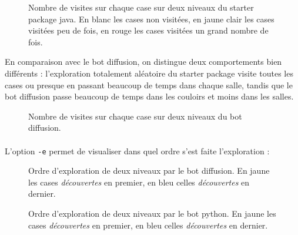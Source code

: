 \documentclass[a4paper,12pt]{article}
\begin{document}
\begin{figure}[H]
	\caption{Nombre de visites sur chaque case sur deux niveaux du starter
	package java. En blanc les cases non visitées, en jaune clair les cases
visitées peu de fois, en rouge les cases visitées un grand nombre de fois.}
	\resizebox{\columnwidth}{!}{}
\end{figure}

En comparaison avec le bot diffusion, on distingue deux comportements bien
différents : l'exploration totalement aléatoire du starter package visite
toutes les cases ou presque en passant beaucoup de temps dans chaque salle,
tandis que le bot diffusion passe beaucoup de temps dans les couloirs et moins
dans les salles.

\begin{figure}[H]
	\caption{Nombre de visites sur chaque case sur deux niveaux du bot diffusion.}
	\resizebox{\columnwidth}{!}{}
\end{figure}

\paragraph{} L'option \verb!-e! permet de visualiser dans quel ordre s'est
faite l'exploration :

\begin{figure}[H]
	\caption{Ordre d'exploration de deux niveaux par le bot diffusion. En
	jaune les cases \emph{découvertes} en premier, en bleu celles
	\emph{découvertes} en dernier.}
	\resizebox{\columnwidth}{!}{}
\end{figure}

\begin{figure}[H]
	\caption{Ordre d'exploration de deux niveaux par le bot python. En
	jaune les cases \emph{découvertes} en premier, en bleu celles
	\emph{découvertes} en dernier.}
	\resizebox{\columnwidth}{!}{}
\end{figure}
\end{document}

